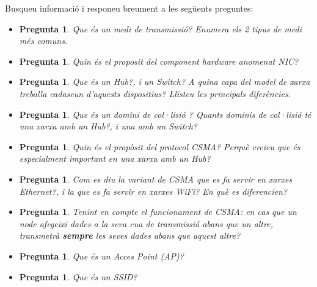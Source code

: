 \documentclass[12pt,a4paper]{article}
\newcounter{exercises}
\newtheorem{exer}[exercises]{Pregunta}
\begin{document}
Busqueu informació i responeu breument a les següents preguntes:
\begin{itemize}
\item \begin{exer}Que és un medi de transmissió? Enumera els 2 tipus de medi més comuns.\end{exer}
\item  \begin{exer} Quin és el proposit del component hardware anomenat NIC?\end{exer}
\item \begin{exer}Que és un Hub?, i un Switch? A quina capa del model de xarxa treballa cadascun d'aquests dispositius? Llisteu les principals diferències.\end{exer}
\item \begin{exer}Que és un domini de col·lisió ? Quants dominis de col·lisió té una xarxa amb un Hub?, i una amb un Switch?\end{exer}
\item \begin{exer} Quin és el propòsit del protocol CSMA? Perquè creieu que és especialment important en una xarxa amb un Hub?\end{exer}
\item \begin{exer} Com es diu la variant de CSMA que es fa servir en xarxes Ethernet?, i la que es fa servir en xarxes WiFi? En què es diferencien? \end{exer}
\item \begin{exer} Tenint en compte el funcionament de CSMA: en cas que un node afegeixi dades a la seva cua de transmissió abans que un altre, transmetrà \textbf{sempre} les seves dades abans que aquest altre? \end{exer}
\item \begin{exer} Que és un Acces Point (AP)?\end{exer}
\item \begin{exer} Que és un SSID? \end{exer}

\end{itemize}
\end{document}
